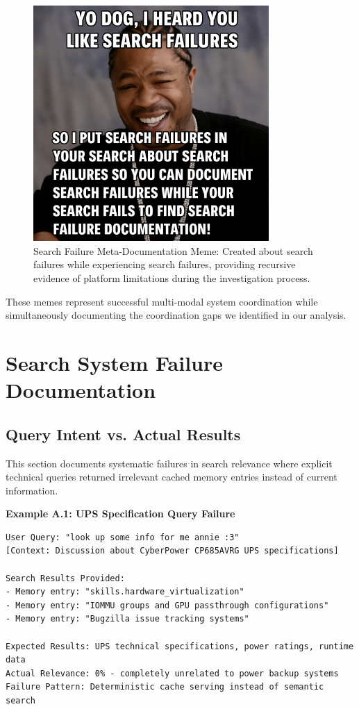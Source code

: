 \documentclass[12pt]{article}
\begin{document}
\begin{figure}[htbp]
\centering
\includegraphics[width=0.8\textwidth]{search-failure-meme.png}
\caption{Search Failure Meta-Documentation Meme: Created about search failures while experiencing search failures, providing recursive evidence of platform limitations during the investigation process.}
\label{fig:search-failure-meme}
\end{figure}

These memes represent successful multi-modal system coordination while simultaneously documenting the coordination gaps we identified in our analysis.




\section{Search System Failure Documentation}
\label{app:search-failures}

\subsection{Query Intent vs. Actual Results}

This section documents systematic failures in search relevance where explicit technical queries returned irrelevant cached memory entries instead of current information.

\textbf{Example A.1: UPS Specification Query Failure}

\begin{verbatim}
User Query: "look up some info for me annie :3"
[Context: Discussion about CyberPower CP685AVRG UPS specifications]

Search Results Provided:
- Memory entry: "skills.hardware_virtualization" 
- Memory entry: "IOMMU groups and GPU passthrough configurations"
- Memory entry: "Bugzilla issue tracking systems"

Expected Results: UPS technical specifications, power ratings, runtime data
Actual Relevance: 0% - completely unrelated to power backup systems
Failure Pattern: Deterministic cache serving instead of semantic search
\end{verbatim}
\end{document}
